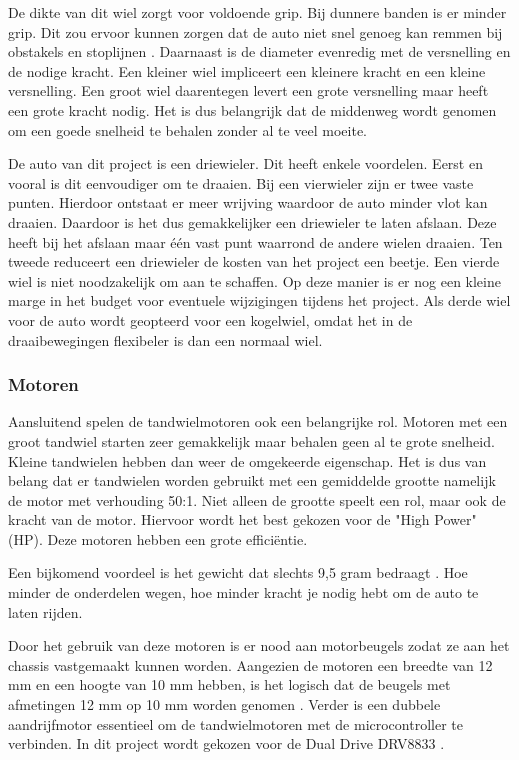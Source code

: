 \documentclass[a4paper,twoside,kulak]{kulakreport} %
\begin{document}
De dikte van dit wiel zorgt voor voldoende grip. Bij dunnere banden is er minder grip. Dit zou ervoor kunnen zorgen dat de auto niet snel genoeg kan remmen bij obstakels en stoplijnen \cite{Banden}.  
Daarnaast is de diameter evenredig met de versnelling en de nodige kracht. Een kleiner wiel impliceert een kleinere kracht en een kleine versnelling. Een groot wiel daarentegen levert een grote versnelling maar heeft een grote kracht nodig. Het is dus belangrijk dat de middenweg wordt genomen om een goede snelheid te behalen zonder al te veel moeite.    

De auto van dit project is een driewieler. Dit heeft enkele voordelen. Eerst en vooral is dit eenvoudiger om te draaien. Bij een vierwieler zijn er twee vaste punten. Hierdoor ontstaat er meer wrijving waardoor de auto minder vlot kan draaien. Daardoor is het dus gemakkelijker een driewieler te laten afslaan. Deze heeft bij het afslaan maar één vast punt waarrond de andere wielen draaien. 
Ten tweede reduceert een driewieler de kosten van het project een beetje. Een vierde wiel is niet noodzakelijk om aan te schaffen. Op deze manier is er nog een kleine marge in het budget voor eventuele wijzigingen tijdens het project. Als derde wiel voor de auto wordt geopteerd voor een kogelwiel, omdat het in de draaibewegingen flexibeler is dan een normaal wiel.
\label{Wielen}


\subsubsection{Motoren}
Aansluitend spelen de tandwielmotoren ook een belangrijke rol. Motoren met een groot tandwiel starten zeer gemakkelijk maar behalen geen al te grote snelheid. Kleine tandwielen hebben dan weer de omgekeerde eigenschap. Het is dus van belang dat er tandwielen worden gebruikt met een gemiddelde grootte namelijk de motor met verhouding 50:1. Niet alleen de grootte speelt een rol, maar ook de kracht van de motor. Hiervoor wordt het best gekozen voor de "High Power" (HP). Deze motoren hebben een grote efficiëntie. 

Een bijkomend voordeel is het gewicht dat slechts 9,5 gram bedraagt \cite{MicroMetalGearMotor50:1HP}. %
Hoe minder de onderdelen wegen, hoe minder kracht je nodig hebt om de auto te laten rijden. 

Door het gebruik van deze motoren is er nood aan motorbeugels zodat ze aan het chassis vastgemaakt kunnen worden. Aangezien de motoren een breedte van 12 mm en een hoogte van 10 mm hebben, is het logisch dat de beugels met afmetingen 12 mm op 10 mm worden genomen \cite{MicroMetalGearMotorBeugel}.
Verder is een dubbele aandrijfmotor essentieel om de tandwielmotoren met de microcontroller te verbinden. In dit project wordt gekozen voor de Dual Drive DRV8833 \cite{DualDriveDRV8833}. 
\label{Motoren}
\end{document}

